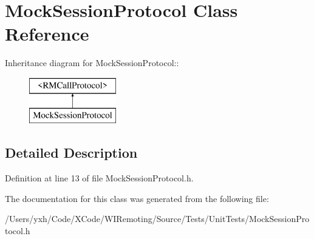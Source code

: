 \hypertarget{interface_mock_session_protocol}{
\section{MockSessionProtocol Class Reference}
\label{interface_mock_session_protocol}
}
Inheritance diagram for MockSessionProtocol::\begin{figure}[H]
\begin{center}
\leavevmode
\includegraphics[height=2cm]{interface_mock_session_protocol}
\end{center}
\end{figure}


\subsection{Detailed Description}


Definition at line 13 of file MockSessionProtocol.h.

The documentation for this class was generated from the following file:\begin{DoxyCompactItemize}
\item 
/Users/yxh/Code/XCode/WIRemoting/Source/Tests/UnitTests/MockSessionProtocol.h\end{DoxyCompactItemize}
